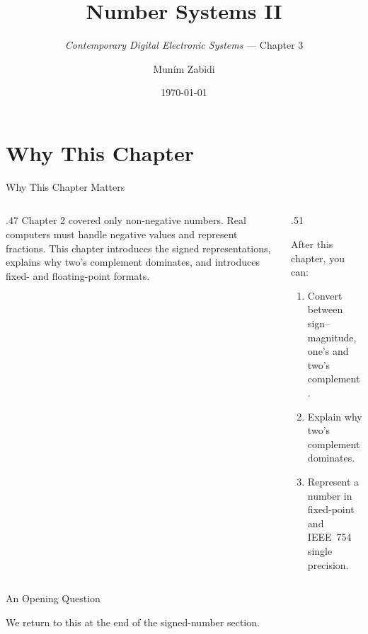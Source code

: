\documentclass[9pt,aspectratio=169,xcolor=table]{beamer}
\title{Number Systems II}
\subtitle{\emph{Contemporary Digital Electronic Systems} --- Chapter 3}
\author{Mun\'{i}m Zabidi}
\institute{\color{primary}Faculty of Electrical Engineering, Universiti Teknologi Malaysia}
\date{\today}
\begin{document}
\titlepage

\section{Why This Chapter}

\begin{frame}{Why This Chapter Matters}
  \begin{columns}[c]
  \begin{column}{.47\textwidth}
    Chapter 2 covered only non-negative numbers. Real computers must handle \alert{negative} values and represent \alert{fractions}. This chapter introduces the signed representations, explains why \alert{two's complement} dominates, and introduces fixed- and floating-point formats.
  \end{column}
  \begin{column}{.51\textwidth}
    \begin{block}{After this chapter, you can:}
    {\small
    \begin{enumerate}\itemsep2pt
      \item Convert between sign--magnitude, one's and two's complement.
      \item Explain why two's complement dominates.
      \item Represent a number in fixed-point and IEEE~754 single precision.
    \end{enumerate}}
    \end{block}
  \end{column}
  \end{columns}
\end{frame}

\begin{frame}{An Opening Question}
  \leavevmode\vspace{4mm}
  \vspace{4mm}
  \begin{center}
  \end{center}
  \vspace{4mm}
  We return to this at the end of the signed-number section.
\end{frame}
\end{document}
